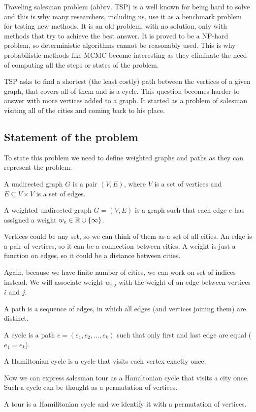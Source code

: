 Traveling salesman problem (abbrv. TSP) is a well known for being hard to solve and this is why many researchers, including us, use it as a benchmark problem for testing new methods. It is an old problem, with no solution, only with methods that try to achieve the best answer. It is proved to be a NP-hard problem, so deterministic algorithms cannot be reasonably used. This is why probabilistic methods like MCMC become interesting as they eliminate the need of computing all the steps or states of the problem.

TSP asks to find a shortest (the least costly) path between the vertices of a given graph, that covers all of them and is a cycle. This question becomes harder to answer with more vertices added to a graph. It started as a problem of salesman visiting all of the cities and coming back to his place.

\subsection{Statement of the problem}
	To state this problem we need to define weighted graphs and paths as they can represent the problem. 
	
	\begin{definition}
		A undirected graph $G$ is a pair $(V, E)$, where $V$ is a set of vertices and $E \subseteq V \times V$ is a set of edges.
	\end{definition}

	\begin{definition}
		A weighted undirected graph $G = (V, E)$ is a graph such that each edge $e$ has assigned a weight $w_e \in \mathbb{R} \cup \left\{ \infty \right\}$.
	\end{definition}
	Vertices could be any set, so we can think of them as a set of all cities. An edge is a pair of vertices, so it can be a connection between cities. A weight is just a function on edges, so it could be a distance between cities. 
	
	Again, because we have finite number of cities, we can work on set of indices instead. We will associate weight $w_{i,j}$ with the weight of an edge between vertices $i$ and $j$.
	
	\begin{definition}
		A path is a sequence of edges, in which all edges (and vertices joining them) are distinct.
	\end{definition}
	\begin{definition}
		A cycle is a path $c = (e_1, e_2, \ldots, e_k)$ such that only first and last edge are equal ($e_1 = e_k$).
	\end{definition}
	\begin{definition}
		A Hamiltonian cycle is a cycle that visits each vertex exactly once.
	\end{definition}
	Now we can express salesman tour as a Hamiltonian cycle that visits a city once. Such a cycle can be thought as a permutation of vertices.
	\begin{definition}
		A tour is a Hamilitonian cycle and we identify it with a permutation of vertices.
	\end{definition}
	
